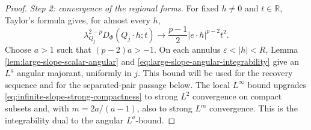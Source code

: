 \documentclass[11pt,reqno]{amsart}
\numberwithin{equation}{section}
\newcommand{\R}{\mathbb R}
\theoremstyle{remark}
\begin{document}
\begin{proof}
\emph{Step 2: convergence of the regional forms.}
For fixed \(h\ne0\) and \(t\in\R\), Taylor's formula gives, for almost
every \(h\),
\begin{equation}
 \lambda_{Q_j}^{2-p}D_\Phi(Q_j\cdot h;t)
 \longrightarrow\frac{p-1}{2}|e\cdot h|^{p-2}t^2.
 \label{eq:infinite-slope-pointwise-density}
\end{equation}
Choose \(a>1\) such that \((p-2)a>-1\).  On each annulus
\(\varepsilon<|h|<R\), Lemma
\ref{lem:large-slope-scalar-angular} and
\eqref{eq:large-slope-angular-integrability} give an \(L^a\) angular
majorant, uniformly in \(j\).  This bound will be used for the recovery
sequence and for the separated-pair passage below.  The local
\(L^\infty\) bound upgrades
\eqref{eq:infinite-slope-strong-compactness} to strong \(L^2\)
convergence on compact subsets and, with
\(m=2a/(a-1)\), also to strong \(L^m\) convergence.  This is the
integrability dual to the angular \(L^a\)-bound.


\end{proof}
\end{document}
